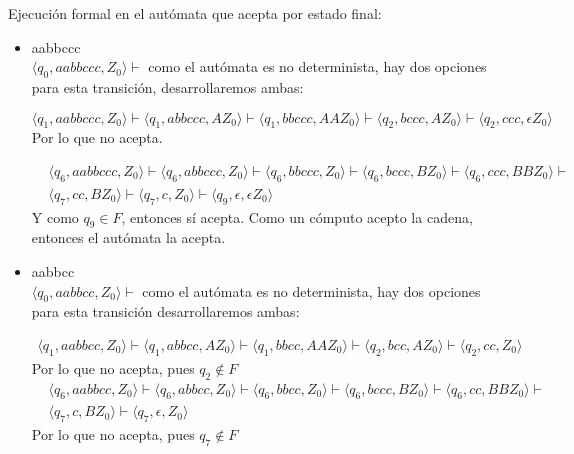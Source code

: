 \documentclass{article}
\begin{document}
\begin{enumerate}
{\begin{enumerate}
{        	Ejecución formal en el autómata que acepta por estado final:
        	\begin{itemize}
        		\item {
        		aabbccc\\
				$\langle q_0, aabbccc, Z_0 \rangle \vdash$ como el autómata es 
				no determinista, hay dos opciones para esta transición, 
				desarrollaremos ambas:
        		
        		\[
					\langle q_1, aabbccc, Z_0 \rangle \vdash 
					\langle q_1, abbccc, AZ_0 \rangle \vdash 
					\langle q_1, bbccc, AAZ_0 \rangle \vdash  
					\langle q_2, bccc, AZ_0 \rangle \vdash 
					\langle q_2, ccc, \epsilon Z_0 \rangle
				\]
				Por lo que no acepta.
        	
        		\begin{align*}
					&\langle q_6, aabbccc, Z_0 \rangle \vdash
					\langle q_6, abbccc, Z_0 \rangle \vdash
					\langle q_6, bbccc, Z_0 \rangle \vdash
					\langle q_6, bccc, BZ_0 \rangle \vdash
					\langle q_6, ccc, BBZ_0 \rangle \vdash \\
					&\langle q_7, cc, BZ_0 \rangle \vdash
					\langle q_7, c, Z_0 \rangle \vdash
					\langle q_9, \epsilon, \epsilon Z_0 \rangle
				\end{align*}
				Y como $q_9 \in F$, entonces sí acepta.
        		Como un cómputo acepto la cadena, entonces el autómata la acepta.
        		}
        		\item {
        		aabbcc \\
				$\langle q_0, aabbcc, Z_0 \rangle \vdash$ como el autómata es no
				determinista, hay dos opciones para esta transición
				desarrollaremos ambas:

				\begin{align*}
					\langle q_1, aabbcc, Z_0 \rangle \vdash 
					\langle q_1, abbcc, AZ_0 \rangle \vdash 
					\langle q_1, bbcc, AAZ_0 \rangle \vdash 
					\langle q_2, bcc, AZ_0 \rangle \vdash 
					\langle q_2, cc, Z_0 \rangle
				\end{align*}
				Por lo que no acepta, pues $q_2 \not \in F$
        		\begin{align*}
					&\langle q_6, aabbcc, Z_0 \rangle \vdash 
					\langle q_6, abbcc, Z_0 \rangle \vdash 
					\langle q_6, bbcc, Z_0 \rangle \vdash 
					\langle q_6, bccc, BZ_0 \rangle \vdash 
					\langle q_6, cc, BBZ_0 \rangle \vdash \\
					&\langle q_7, c, BZ_0 \rangle \vdash 
					\langle q_7, \epsilon, Z_0 \rangle
				\end{align*}
				Por lo que no acepta, pues $q_7 \not \in F$
        		
}
\end{itemize}}
\end{enumerate}}
\end{enumerate}
\end{document}
